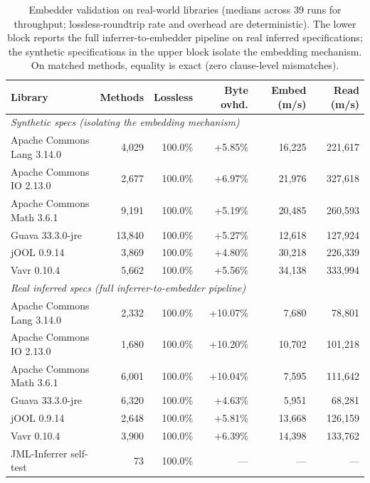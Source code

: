 \begin{table}[ht]
\centering
\caption{Embedder validation on real-world libraries (medians across 39 runs for
throughput; lossless-roundtrip rate and overhead are deterministic). The lower
block reports the full inferrer-to-embedder pipeline on real inferred
specifications; the synthetic specifications in the upper block isolate the
embedding mechanism. On matched methods, equality is exact (zero clause-level
mismatches).}
\label{tab:a2-validation}
\begin{tabular}{lrrrrr}
\toprule
\textbf{Library} & \textbf{Methods} & \textbf{Lossless} & \textbf{Byte ovhd.} & \textbf{Embed (m/s)} & \textbf{Read (m/s)} \\
\midrule
\multicolumn{6}{l}{\textit{Synthetic specs (isolating the embedding mechanism)}} \\
Apache Commons Lang 3.14.0  & 4{,}029  & 100.0\% & +5.85\% & 16{,}225 & 221{,}617 \\
Apache Commons IO 2.13.0    & 2{,}677  & 100.0\% & +6.97\% & 21{,}976 & 327{,}618 \\
Apache Commons Math 3.6.1   & 9{,}191  & 100.0\% & +5.19\% & 20{,}485 & 260{,}593 \\
Guava 33.3.0-jre            & 13{,}840 & 100.0\% & +5.27\% & 12{,}618 & 127{,}924 \\
jOOL 0.9.14                 & 3{,}869  & 100.0\% & +4.80\% & 30{,}218 & 226{,}339 \\
Vavr 0.10.4                 & 5{,}662  & 100.0\% & +5.56\% & 34{,}138 & 333{,}994 \\
\midrule
\multicolumn{6}{l}{\textit{Real inferred specs (full inferrer-to-embedder pipeline)}} \\
Apache Commons Lang 3.14.0  & 2{,}332  & 100.0\% & +10.07\% & 7{,}680  & 78{,}801 \\
Apache Commons IO 2.13.0    & 1{,}680  & 100.0\% & +10.20\% & 10{,}702 & 101{,}218 \\
Apache Commons Math 3.6.1   & 6{,}001  & 100.0\% & +10.04\% & 7{,}595  & 111{,}642 \\
Guava 33.3.0-jre            & 6{,}320  & 100.0\% & +4.63\%  & 5{,}951  & 68{,}281 \\
jOOL 0.9.14                 & 2{,}648  & 100.0\% & +5.81\%  & 13{,}668 & 126{,}159 \\
Vavr 0.10.4                 & 3{,}900  & 100.0\% & +6.39\%  & 14{,}398 & 133{,}762 \\
JML-Inferrer self-test      & 73       & 100.0\% & ---      & ---      & --- \\
\bottomrule
\end{tabular}
\end{table}


